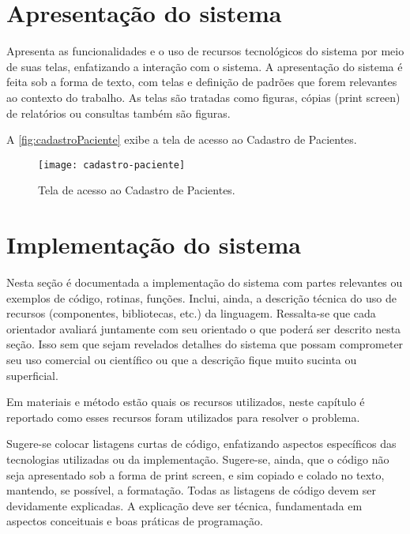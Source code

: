\section{Apresentação do sistema}\label{sec:apresentacaoSistema}

Apresenta as funcionalidades e o uso de recursos tecnológicos do sistema por meio de suas telas, enfatizando a interação com o sistema. A apresentação do sistema é feita sob a forma de texto, com telas e definição de padrões que forem relevantes ao contexto do trabalho. As telas são tratadas como figuras, cópias (print screen) de relatórios ou consultas também são figuras.

A \autoref{fig:cadastroPaciente} exibe a tela de acesso ao Cadastro de Pacientes.

\begin{figure}[htpb]
    \captionsetup{width=0.43\textwidth}
    \caption{Tela de acesso ao Cadastro de Pacientes.}
    \label{fig:cadastroPaciente}
    \texttt{[image: cadastro-paciente]}
    \fonte{}
\end{figure}

\section{Implementação do sistema}\label{sec:implementacaoSistema}

Nesta seção é documentada a implementação do sistema com partes relevantes ou exemplos de código, rotinas, funções. Inclui, ainda, a descrição técnica do uso de recursos (componentes, bibliotecas, etc.) da linguagem. Ressalta-se que cada orientador avaliará juntamente com seu orientado o que poderá ser descrito nesta seção. Isso sem que sejam revelados detalhes do sistema que possam comprometer seu uso comercial ou científico ou que a descrição fique muito sucinta ou superficial.

Em materiais e método estão quais os recursos utilizados, neste capítulo é reportado como esses recursos foram utilizados para resolver o problema.

Sugere-se colocar listagens curtas de código, enfatizando aspectos específicos das tecnologias utilizadas ou da implementação. Sugere-se, ainda, que o código não seja apresentado sob a forma de print screen, e sim copiado e colado no texto, mantendo, se possível, a formatação. Todas as listagens de código devem ser devidamente explicadas. A explicação deve ser técnica, fundamentada em aspectos conceituais e boas práticas de programação.


